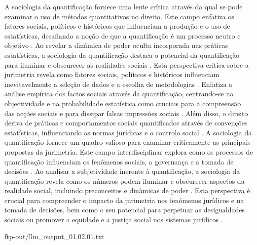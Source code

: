 \begin{agradecimentos}
    A sociologia da quantificação fornece uma lente crítica através da qual se pode examinar o uso de métodos quantitativos no direito. Este campo enfatiza os fatores sociais, políticos e históricos que influenciam a produção e o uso de estatísticas, desafiando a noção de que a quantificação é um processo neutro e objetivo \cite{10.1007/978-3-319-44000-215,10.3390/fi9040068} . Ao revelar a dinâmica de poder oculta incorporada nas práticas estatísticas, a sociologia da quantificação destaca o potencial da quantificação para iluminar e obscurecer as realidades sociais \cite{10.1007/978-3-319-44000-215,10.3390/fi9040068}. Esta perspectiva crítica sobre a jurimetria revela como fatores sociais, políticos e históricos influenciam inevitavelmente a seleção de dados e a escolha de metodologias \cite{10.1007/978-3-319-44000-215,10.3390/fi9040068}. Enfatiza a análise empírica dos factos sociais através da quantificação, centrando-se na objectividade e na probabilidade estatística como cruciais para a compreensão das acções sociais e para dissipar falsas impressões sociais \cite{sousa2024}. Além disso, o direito deriva de práticas e comportamentos sociais quantificados através de convenções estatísticas, influenciando as normas jurídicas e o controlo social \cite{ribeiro2021,sousa2024}. A sociologia da quantificação fornece um quadro valioso para examinar criticamente as principais propostas da jurimetria. Este campo interdisciplinar explora como os processos de quantificação influenciam os fenômenos sociais, a governança e a tomada de decisões \cite{101111lsi12334}. Ao analisar a subjetividade inerente à quantificação, a sociologia da quantificação revela como os números podem iluminar e obscurecer aspectos da realidade social, incluindo preconceitos e dinâmicas de poder \cite{101111lsi12334,101057s4159902003965}. Esta perspectiva é crucial para compreender o impacto da jurimetria nos fenómenos jurídicos e na tomada de decisões, bem como o seu potencial para perpetuar as desigualdades sociais ou promover a equidade e a justiça social nos sistemas jurídicos \cite{101111lsi12334,101057s4159902003965}. 
    
    ftp-out/llm_output_01.02.01.txt 
    

\end{agradecimentos}
